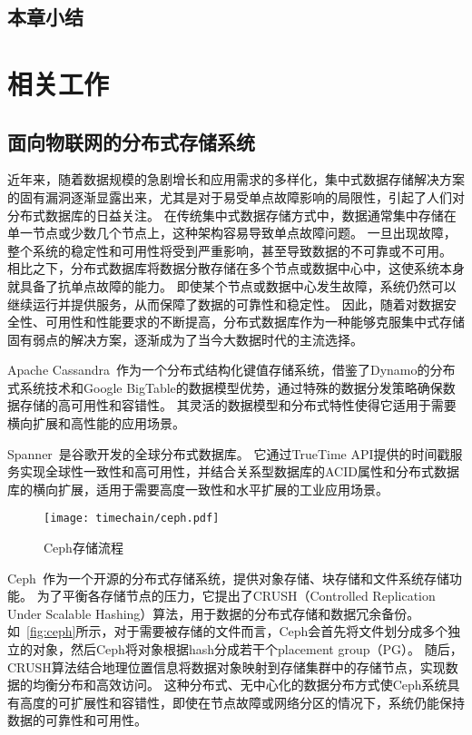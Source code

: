 \section{本章小结}

\chapter{相关工作}
\section{面向物联网的分布式存储系统}
近年来，随着数据规模的急剧增长和应用需求的多样化，集中式数据存储解决方案的固有漏洞逐渐显露出来，尤其是对于易受单点故障影响的局限性，引起了人们对分布式数据库的日益关注。
在传统集中式数据存储方式中，数据通常集中存储在单一节点或少数几个节点上，这种架构容易导致单点故障问题。
一旦出现故障，整个系统的稳定性和可用性将受到严重影响，甚至导致数据的不可靠或不可用。
相比之下，分布式数据库将数据分散存储在多个节点或数据中心中，这使系统本身就具备了抗单点故障的能力。
即使某个节点或数据中心发生故障，系统仍然可以继续运行并提供服务，从而保障了数据的可靠性和稳定性。
因此，随着对数据安全性、可用性和性能要求的不断提高，分布式数据库作为一种能够克服集中式存储固有弱点的解决方案，逐渐成为了当今大数据时代的主流选择。

Apache Cassandra~\cite{lakshman2010cassandra}作为一个分布式结构化键值存储系统，借鉴了Dynamo的分布式系统技术和Google BigTable的数据模型优势，通过特殊的数据分发策略确保数据存储的高可用性和容错性。
其灵活的数据模型和分布式特性使得它适用于需要横向扩展和高性能的应用场景。

Spanner~\cite{corbett2013spanner}是谷歌开发的全球分布式数据库。
它通过TrueTime API提供的时间戳服务实现全球性一致性和高可用性，并结合关系型数据库的ACID属性和分布式数据库的横向扩展，适用于需要高度一致性和水平扩展的工业应用场景。

\begin{figure}[t]
    \centering
    \texttt{[image: timechain/ceph.pdf]}
    \caption{Ceph存储流程}
    \label{fig:ceph}
\end{figure}

Ceph~\cite{weil2006ceph}作为一个开源的分布式存储系统，提供对象存储、块存储和文件系统存储功能。
为了平衡各存储节点的压力，它提出了CRUSH（Controlled Replication Under Scalable Hashing）算法，用于数据的分布式存储和数据冗余备份。
如~\autoref{fig:ceph}所示，对于需要被存储的文件而言，Ceph会首先将文件划分成多个独立的对象，然后Ceph将对象根据hash分成若干个placement group（PG）。
随后，CRUSH算法结合地理位置信息将数据对象映射到存储集群中的存储节点，实现数据的均衡分布和高效访问。
这种分布式、无中心化的数据分布方式使Ceph系统具有高度的可扩展性和容错性，即使在节点故障或网络分区的情况下，系统仍能保持数据的可靠性和可用性。


